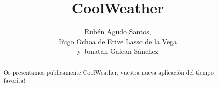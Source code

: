 \documentclass[]{article}
\title{CoolWeather}
\author{Rub\'en Agudo Santos, \\ I\~nigo Ochoa de Erive Lasso de la Vega \\ y Jonatan
Galean S\'anchez}
\begin{document}
\maketitle

\begin{abstract}
Os presentamos p\'ublicamente CoolWeather, \textexclamdown vuestra nueva aplicaci\'on
del tiempo favorita!
\end{abstract}

\section{}
\end{document}
